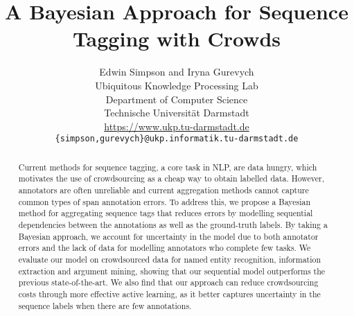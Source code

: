 \documentclass[11pt,a4paper]{article}
\title{A Bayesian Approach for Sequence Tagging with Crowds}
\author{Edwin Simpson and Iryna Gurevych\\
  Ubiquitous Knowledge Processing Lab \\
  Department of Computer Science \\
  Technische Universit\"at Darmstadt \\
  \url{https://www.ukp.tu-darmstadt.de} \\
  {\tt \{simpson,gurevych\}@ukp.informatik.tu-darmstadt.de}
}
\begin{document}
\maketitle


\begin{abstract}
Current methods for sequence tagging, a core task in NLP, are data hungry,
which motivates the use of crowdsourcing as a cheap way to obtain labelled data.
However, annotators are often unreliable and current aggregation methods cannot capture common types of span annotation errors.
To address this, we propose a Bayesian method for aggregating sequence tags
 that reduces errors by modelling sequential dependencies between the
 annotations as well as the ground-truth labels.
By taking a Bayesian approach, we account for uncertainty in the model due to both
annotator errors and 
the lack of data for modelling annotators who complete few tasks.
We evaluate our model on crowdsourced data for named entity recognition, information extraction and argument mining,
showing that our sequential model outperforms the previous state-of-the-art. 
We also find that
 our approach can reduce crowdsourcing costs through
 more effective active learning, as it 
better captures uncertainty in the sequence labels when there are few annotations.
\end{abstract}









\end{document}
